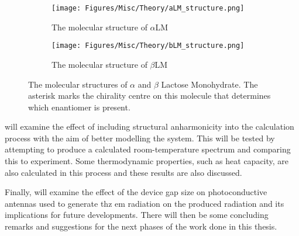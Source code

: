  \begin{figure}[h]
\centering
\begin{subfigure}{0.49\textwidth}
\centering
\texttt{[image: Figures/Misc/Theory/aLM\_structure.png]}
\captionsetup{font = footnotesize, justification = centering}
\caption{The molecular structure of ${\alpha}$LM}
\label{fig:aLMStruct}
\end{subfigure}
\hfill
\begin{subfigure}{0.49\textwidth}
\centering
\texttt{[image: Figures/Misc/Theory/bLM\_structure.png]}
\captionsetup{font = footnotesize, justification = centering}
\caption{The molecular structure of ${\beta}$LM}
\label{fig:bLMStruct}
\end{subfigure}
\captionsetup{font = footnotesize, justification = centering}
\caption[The Molecular Structures of \(\alpha\) and \(\beta\) Lactose Monohydrate]{The molecular structures of \(\alpha\) and \(\beta\) Lactose Monohydrate. The asterisk marks the chirality centre on this molecule that determines which enantiomer is present.}
\label{fig:aLMbLMStructures}
\end{figure}

 will examine the effect of including structural anharmonicity into the calculation process with the aim of better modelling the system. This will be tested by attempting to produce a calculated room\nobreakdash-temperature spectrum and comparing this to experiment. Some thermodynamic properties, such as heat capacity, are also calculated in this process and these results are also discussed.

Finally,  will examine the effect of the device gap size on photoconductive antennas used to generate \acrshort{thz} \acrshort{em} radiation on the produced radiation and its implications for future developments. There will then be some concluding remarks and suggestions for the next phases of the work done in this thesis.